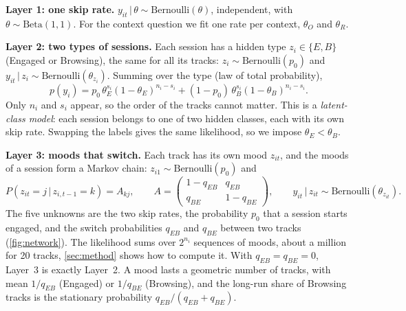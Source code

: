 \documentclass[12pt]{article}
\newcommand{\given}{\,\vert\,}
\begin{document}
\textbf{Layer 1: one skip rate.} $y_{it} \given \theta \sim \text{Bernoulli}(\theta)$, independent, with $\theta \sim \text{Beta}(1,1)$. For the context question we fit one rate per context, $\theta_O$ and $\theta_R$.

\textbf{Layer 2: two types of sessions.} Each session has a hidden type $z_i \in \{E, B\}$ (Engaged or Browsing), the same for all its tracks: $z_i \sim \text{Bernoulli}(p_0)$ and $y_{it} \given z_i \sim \text{Bernoulli}(\theta_{z_i})$. Summing over the type (law of total probability),
\[
p(y_i) = p_0\, \theta_E^{s_i}(1-\theta_E)^{n_i - s_i} + (1-p_0)\, \theta_B^{s_i}(1-\theta_B)^{n_i - s_i}.
\]
Only $n_i$ and $s_i$ appear, so the order of the tracks cannot matter. This is a \emph{latent-class model}: each session belongs to one of two hidden classes, each with its own skip rate. Swapping the labels gives the same likelihood, so we impose $\theta_E < \theta_B$.

\textbf{Layer 3: moods that switch.} Each track has its own mood $z_{it}$, and the moods of a session form a Markov chain: $z_{i1} \sim \text{Bernoulli}(p_0)$ and
\[
P(z_{it} = j \given z_{i,t-1} = k) = A_{kj}, \qquad
A = \begin{pmatrix} 1-q_{EB} & q_{EB} \\ q_{BE} & 1-q_{BE} \end{pmatrix}, \qquad
y_{it} \given z_{it} \sim \text{Bernoulli}(\theta_{z_{it}}).
\]
The five unknowns are the two skip rates, the probability $p_0$ that a session starts engaged, and the switch probabilities $q_{EB}$ and $q_{BE}$ between two tracks (\cref{fig:network}). The likelihood sums over $2^{n_i}$ sequences of moods, about a million for 20 tracks, \cref{sec:method} shows how to compute it. With $q_{EB} = q_{BE} = 0$, Layer~3 is exactly Layer~2. A mood lasts a geometric number of tracks, with mean $1/q_{EB}$ (Engaged) or $1/q_{BE}$ (Browsing), and the long-run share of Browsing tracks is the stationary probability $q_{EB}/(q_{EB}+q_{BE})$.
\end{document}
